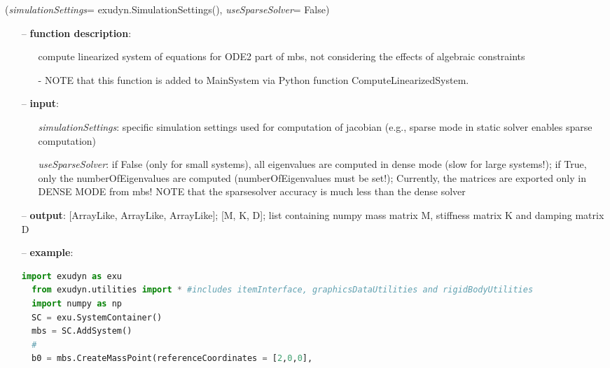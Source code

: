 %
\begin{flushleft}
\label{sec:mainsystemextensions:ComputeLinearizedSystem}
({\it simulationSettings}= exudyn.SimulationSettings(), {\it useSparseSolver}= False)
\end{flushleft}
\setlength{\itemindent}{0.7cm}
\begin{itemize}[leftmargin=0.7cm]
\item[--]
{\bf function description}: \vspace{-6pt}
\begin{itemize}[leftmargin=1.2cm]
\setlength{\itemindent}{-0.7cm}
\item[]compute linearized system of equations for ODE2 part of mbs, not considering the effects of algebraic constraints
\item[]- NOTE that this function is added to MainSystem via Python function ComputeLinearizedSystem.
\end{itemize}
\item[--]
{\bf input}: \vspace{-6pt}
\begin{itemize}[leftmargin=1.2cm]
\setlength{\itemindent}{-0.7cm}
\item[]{\it simulationSettings}: specific simulation settings used for computation of jacobian (e.g., sparse mode in static solver enables sparse computation)
\item[]{\it useSparseSolver}: if False (only for small systems), all eigenvalues are computed in dense mode (slow for large systems!); if True, only the numberOfEigenvalues are computed (numberOfEigenvalues must be set!); Currently, the matrices are exported only in DENSE MODE from mbs! NOTE that the sparsesolver accuracy is much less than the dense solver
\end{itemize}
\item[--]
{\bf output}: [ArrayLike, ArrayLike, ArrayLike]; [M, K, D]; list containing numpy mass matrix M, stiffness matrix K and damping matrix D
\item[--]
{\bf example}: \vspace{-12pt}\ei\begin{lstlisting}[language=Python, xleftmargin=36pt]
  import exudyn as exu
  from exudyn.utilities import * #includes itemInterface, graphicsDataUtilities and rigidBodyUtilities
  import numpy as np
  SC = exu.SystemContainer()
  mbs = SC.AddSystem()
  #
  b0 = mbs.CreateMassPoint(referenceCoordinates = [2,0,0],

\end{lstlisting}
\end{itemize}

